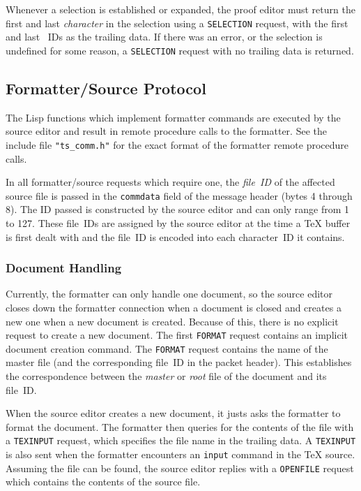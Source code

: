 Whenever a selection is established or expanded, the proof editor must
return the first and last {\em character} in the selection using a
{\tt SELECTION} request, with the first and last \tbox~IDs as the
trailing data.  If there was an error, or the selection is undefined
for some reason, a {\tt SELECTION} request with no trailing data is
returned.

\subsection{Formatter/Source Protocol}

The Lisp functions which implement formatter commands are executed by
the source editor and result in remote procedure calls to the
formatter.  See the include file {\tt "ts\_comm.h"} for the exact
format of the formatter remote procedure calls.

In all formatter/source requests which require one, the {\em file~ID}
of the affected source file is passed in the {\tt commdata} field of
the message header (bytes 4 through 8).  The ID passed is constructed
by the source editor and can only range from 1 to 127.  These file~IDs
are assigned by the source editor at the time a {\TeX} buffer is first
dealt with and the file~ID is encoded into each character~ID it contains.

\subsubsection{Document Handling}

Currently, the {\VorTeX} formatter can only handle one document, so the
source editor closes down the formatter connection when a document is
closed and creates a new one when a new document is created.  Because of
this, there is no explicit request to create a new document.  The first
{\tt FORMAT} request contains an implicit document creation command.
The {\tt FORMAT} request contains the name of the master file (and the
corresponding file~ID in the packet header).  This establishes the
correspondence between the {\em master} or {\em root} file of the
document and its file~ID.

When the source editor creates a new document, it justs asks the formatter
to format the document.  The formatter then queries for the contents of
the file with a {\tt TEXINPUT} request, which specifies the file name in
the trailing data.  A {\tt TEXINPUT} is also sent when the formatter
encounters an {\tt \bsl input} command in the {\TeX} source.  Assuming the
file can be found, the source editor replies with a {\tt OPENFILE}
request which contains the contents of the source file.

